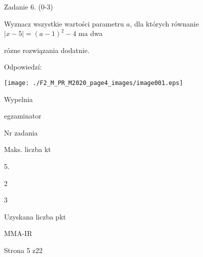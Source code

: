\documentclass[a4paper,12pt]{article}
\begin{document}
Zadanie 6. (0-3)

Wyznacz wszystkie wartości parametru $a$, dla których równanie $|x-5|=(a-1)^{2}-4$ ma dwa

rózne rozwiązania dodatnie.

Odpowiedzí:
\begin{center}
\texttt{[image: ./F2\_M\_PR\_M2020\_page4\_images/image001.eps]}
\end{center}
Wypelnia

egzaminator

Nr zadania

Maks. liczba kt

5.

2

3

Uzyskana liczba pkt

MMA-IR

Strona 5 z22
\end{document}
